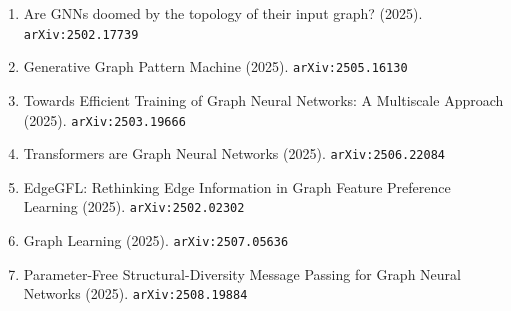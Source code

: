 \documentclass[11pt]{article}
\begin{document}
\begin{enumerate}
  \item Are GNNs doomed by the topology of their input graph? (2025). \texttt{arXiv:2502.17739}
  \item Generative Graph Pattern Machine (2025). \texttt{arXiv:2505.16130}
  \item Towards Efficient Training of Graph Neural Networks: A Multiscale Approach (2025). \texttt{arXiv:2503.19666}
  \item Transformers are Graph Neural Networks (2025). \texttt{arXiv:2506.22084}
  \item EdgeGFL: Rethinking Edge Information in Graph Feature Preference
  Learning (2025). \texttt{arXiv:2502.02302}
  \item Graph Learning (2025). \texttt{arXiv:2507.05636}
  \item Parameter-Free Structural-Diversity Message Passing for Graph Neural Networks (2025). \texttt{arXiv:2508.19884}
\end{enumerate}
\end{document}
